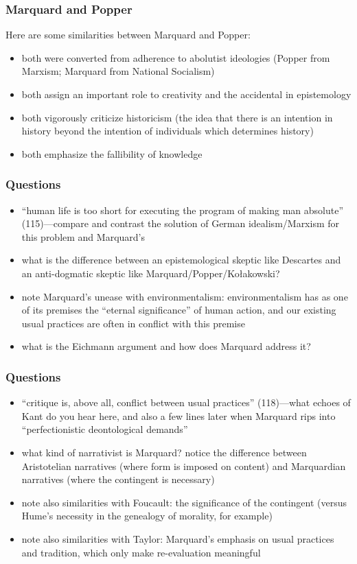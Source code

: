 \documentclass[xcolor=dvipsnames]{beamer}
\begin{document}
\begin{frame}
  \frametitle{Marquard and Popper}
  Here are some similarities between Marquard and Popper:
  \begin{itemize}
  \item both were converted from adherence to abolutist ideologies
    (Popper from Marxism; Marquard from National Socialism)
  \item both assign an important role to creativity and the accidental
    in epistemology
  \item both vigorously criticize historicism (the idea that there is
    an intention in history beyond the intention of individuals which
    determines history)
  \item both emphasize the fallibility of knowledge
  \end{itemize}
\end{frame}

\begin{frame}
  \frametitle{Questions}
  \begin{itemize}
  \item ``human life is too short for executing the program of making
    man absolute'' (115)---compare and contrast the solution of German
    idealism/Marxism for this problem and Marquard's
  \item what is the difference between an epistemological skeptic like
    Descartes and an anti-dogmatic skeptic like
    Marquard/Popper/Ko{\l{}}akowski?
  \item note Marquard's unease with environmentalism: environmentalism
    has as one of its premises the ``eternal significance'' of human
    action, and our existing usual practices are often in conflict
    with this premise
  \item what is the Eichmann argument and how does Marquard address
    it?
  \end{itemize}
\end{frame}

\begin{frame}
  \frametitle{Questions}
  \begin{itemize}
  \item ``critique is, above all, conflict between usual
    practices'' (118)---what echoes of Kant do you hear here, and also
    a few lines later when Marquard rips into ``perfectionistic
    deontological demands''
  \item what kind of narrativist is Marquard? notice the difference
    between Aristotelian narratives (where form is imposed on content)
    and Marquardian narratives (where the contingent is necessary)
  \item note also similarities with Foucault: the significance of the
    contingent (versus Hume's necessity in the genealogy of morality,
    for example)
  \item note also similarities with Taylor: Marquard's emphasis on
    usual practices and tradition, which only make re-evaluation
    meaningful
  \end{itemize}
\end{frame}
\end{document}
